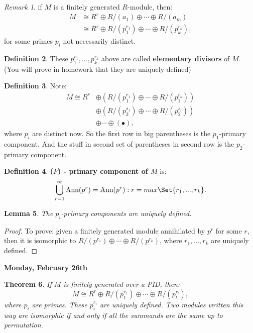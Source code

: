 \documentclass[9pt,reqno,twoside]{amsbook}
\theoremstyle{plain}
\newtheorem{theorem}{Theorem}[chapter]
\numberwithin{section}{chapter}
\numberwithin{equation}{chapter}
\newtheorem{lem}[theorem]{Lemma}
\theoremstyle{definition}
\newtheorem{Def}[theorem]{Definition}
\theoremstyle{remark}
\newtheorem{rem}[theorem]{Remark}
\theoremstyle{plain}
\newcommand{\bb}{\vspace{3mm}}
\newcommand{\bee}{\begin{equation}\begin{aligned}}
\newcommand{\eee}{\end{aligned}\end{equation}}
\newcommand{\lpar}{\left(}
\newcommand{\rpar}{\right)}
\begin{document}
\begin{rem}
if $M$ is a finitely generated $R$-module, then:
\bee
M &\cong R^r \oplus R/(a_1) \oplus \cdots \oplus R/(a_m)\\
&\cong R^r \oplus  R/(p_1^{r_1}) \oplus \cdots \oplus R/(p_k^{r_k}),
\eee
for some primes $p_i$ not necessarily distinct. 
\end{rem}

\begin{Def}
These $p_1^{r_1},...,p_k^{r_k}$ above are called \textbf{elementary divisors} of $M$. (You will prove in homework that they are uniquely defined)
\end{Def}

\begin{Def}
Note:
\bee
M \cong R^r &\oplus \lpar R/(p_1^{r_1}) \oplus \cdots \oplus R/(p_1^{r_k})\rpar\\
&\oplus \lpar R/(p_2^{s_1}) \oplus \cdots \oplus R/(p_2^{s_l})\rpar\\
&\oplus \cdots \oplus \lpar • \rpar,
\eee
where $p_i$ are distinct now. So the first row in big parentheses is the $p_1$-primary component. And the stuff in second set of parentheses in second row is the $p_2$-primary component. 
\end{Def}

\begin{Def}
\textbf{($P$) - primary component of $M$} is:
$$
\bigcup_{r = 1}^\infty \text{Ann}(p^r) =\text{Ann}(p^r):r = max\Set{r_1,...,r_k}.
$$
\end{Def}

\begin{lem}
The $p_i$-primary components are uniquely defined. 
\end{lem}

\begin{proof}
To prove: given a finitely generated module annihilated by $p^r$ for some $r$, then it is isomorphic to $R/(p^{r_1}) \oplus \cdots \oplus R/(p^{r_k})$, where $r_1,...,r_k$ are uniquely defined. 
\end{proof}

\bb\bb

\textbf{Monday, February 26th}

\begin{theorem}

If $M$ is finitely generated over a PID, then:
$$
M \cong R^r \oplus R/(p_1^{r_1}) \oplus \cdots \oplus R/(p_l^{r_l}),
$$
where $p_i$ are primes. These $p_i^{r_i}$ are uniquely defined. Two modules written this way are isomorphic if and only if all the summands are the same up to permutation. 

\end{theorem}
\end{document}
